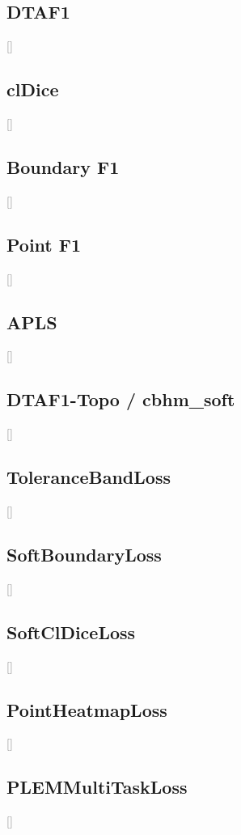 \documentclass[sigconf]{acmart}
\newcommand{\tbd}[1]{\textcolor{gray}{[#1]}}
\begin{document}
\subsection{DTAF1}
\label{app:b2}
\tbd{}

\subsection{clDice}
\label{app:b3}
\tbd{}

\subsection{Boundary F1}
\label{app:b4}
\tbd{}

\subsection{Point F1}
\label{app:b5}
\tbd{}

\subsection{APLS}
\label{app:b6}
\tbd{}

\subsection{DTAF1-Topo / cbhm\_soft}
\label{app:b7}
\tbd{}

\subsection{ToleranceBandLoss}
\label{app:b8}
\tbd{}

\subsection{SoftBoundaryLoss}
\label{app:b9}
\tbd{}

\subsection{SoftClDiceLoss}
\label{app:b10}
\tbd{}

\subsection{PointHeatmapLoss}
\label{app:b11}
\tbd{}

\subsection{PLEMMultiTaskLoss}
\label{app:b12}
\tbd{}
\end{document}
